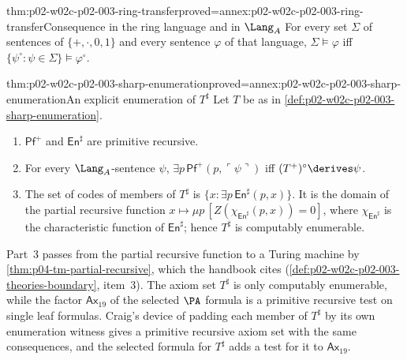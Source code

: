 \begin{hblemma}{thm:p02-w02c-p02-003-ring-transfer}{proved=annex:p02-w02c-p02-003-ring-transfer}{Consequence in the ring language and in \(\Lang_A\)}
For every set \(\Sigma\) of sentences of \(\{+,\cdot,0,1\}\) and every
sentence \(\varphi\) of that language,
\(\Sigma\models\varphi\) iff
\(\{\psi^{\circ}:\psi\in\Sigma\}\models\varphi^{\circ}\).
\end{hblemma}

\begin{hblemma}{thm:p02-w02c-p02-003-sharp-enumeration}{proved=annex:p02-w02c-p02-003-sharp-enumeration}{An explicit enumeration of \(T^{\sharp}\)}
Let \(T\) be as in \cref{def:p02-w02c-p02-003-sharp-enumeration}.
\begin{enumerate}
\item \(\mathsf{Pf}^{+}\) and \(\mathsf{En}^{\sharp}\) are primitive
      recursive.
\item For every \(\Lang_A\)-sentence \(\psi\),
      \(\exists p\,\mathsf{Pf}^{+}(p,\ulcorner\psi\urcorner)\) iff
      \((T^{+})^{\circ}\derives\psi\).
\item The set of codes of members of \(T^{\sharp}\) is
      \(\{x:\exists p\,\mathsf{En}^{\sharp}(p,x)\}\).  It is the domain
      of the partial recursive function
      \(x\mapsto\mu p\,[Z(\chi_{\mathsf{En}^{\sharp}}(p,x))=0]\), where
      \(\chi_{\mathsf{En}^{\sharp}}\) is the characteristic function of
      \(\mathsf{En}^{\sharp}\); hence \(T^{\sharp}\) is computably
      enumerable.
\end{enumerate}
\end{hblemma}

Part~3 passes from the partial recursive function to a Turing machine by
\cref{thm:p04-tm-partial-recursive}, which the handbook cites
(\cref{def:p02-w02c-p02-003-theories-boundary}, item~3).  The axiom set
\(T^{\sharp}\) is only computably enumerable, while the factor
\(\mathsf{Ax}_{19}\) of the selected \(\PA\) formula is a primitive
recursive test on single leaf formulas.  Craig's device of padding each
member of \(T^{\sharp}\) by its own enumeration witness gives a primitive
recursive axiom set with the same consequences, and the selected formula
for \(T^{\sharp}\) adds a test for it to \(\mathsf{Ax}_{19}\).

